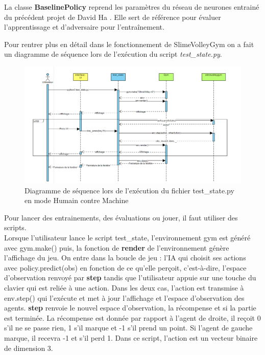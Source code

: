 \documentclass[11pt, a4paper]{article}
\begin{document}
	\vspace{0.5cm}

	La classe \textbf{BaselinePolicy} reprend les paramètres du réseau de neurones entrainé du précédent projet de David Ha \cite{ha2015slimevolley}. Elle sert de référence pour évaluer l'apprentissage et d'adversaire pour l'entraînement.

	\vspace{0.5cm}

	Pour rentrer plus en détail dans le fonctionnement de SlimeVolleyGym on a fait un diagramme de séquence lors de l'exécution du script \textit{test\_state.py}.

	\begin{figure}[H]
		\centering
		\includegraphics[scale=0.5]{images/diagramme_sequence.PNG}
		\caption {Diagramme de séquence lors de l’exécution du fichier test\_state.py en mode Humain contre Machine}
	\end{figure}

	Pour lancer des entrainements, des évaluations ou jouer, il faut utiliser des scripts. \\
	Lorsque l'utilisateur lance le script test\_state, l'environnement gym est généré avec gym.make() puis, la fonction de \textbf{render} de l'environnement génère l'affichage du jeu. On entre dans la boucle de jeu : l'IA qui choisit ses actions avec policy.predict(obs) en fonction de ce qu'elle perçoit, c'est-à-dire, l'espace d'observation renvoyé par \textbf{step} tandis que l'utilisateur appuie sur une touche du clavier qui est reliée à une action. Dans les deux cas, l'action est transmise à env.step() qui l'exécute et met à jour l'affichage et l'espace d'observation des agents. \textbf{step} renvoie le nouvel espace d'observation, la récompense et si la partie est terminée. La récompense est donnée par rapport à l'agent de droite, il reçoit 0 s'il ne se passe rien, 1 s'il marque et -1 s'il prend un point. Si l'agent de gauche marque, il recevra -1 et s'il perd 1. Dans ce script, l'action est un vecteur binaire de dimension 3.
\end{document}
